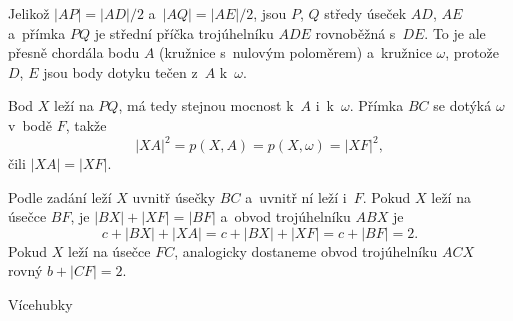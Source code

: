 {    Jelikož $|AP| = |AD|/2$ a~$|AQ| = |AE|/2$, jsou $P$, $Q$ středy úseček $AD$, $AE$ a~přímka $PQ$ je střední příčka trojúhelníku $ADE$ rovnoběžná s~$DE$. To je ale přesně chordála bodu $A$ (kružnice s~nulovým poloměrem) a~kružnice $\omega$, protože $D$, $E$ jsou body dotyku tečen z~$A$ k~$\omega$.

    Bod $X$ leží na $PQ$, má tedy stejnou mocnost k~$A$ i~k~$\omega$. Přímka $BC$ se dotýká $\omega$ v~bodě $F$, takže
    $$
    |XA|^2 = p(X,A) = p(X,\omega) = |XF|^2,
    $$
    čili $|XA| = |XF|$.

    Podle zadání leží $X$ uvnitř úsečky $BC$ a~uvnitř ní leží i~$F$. Pokud $X$ leží na úsečce $BF$, je $|BX| + |XF| = |BF|$ a~obvod trojúhelníku $ABX$ je
    $$
    c + |BX| + |XA| = c + |BX| + |XF| = c + |BF| = 2.
    $$
    Pokud $X$ leží na úsečce $FC$, analogicky dostaneme obvod trojúhelníku $ACX$ rovný $b + |CF| = 2$.
}

\secc Vícehubky


